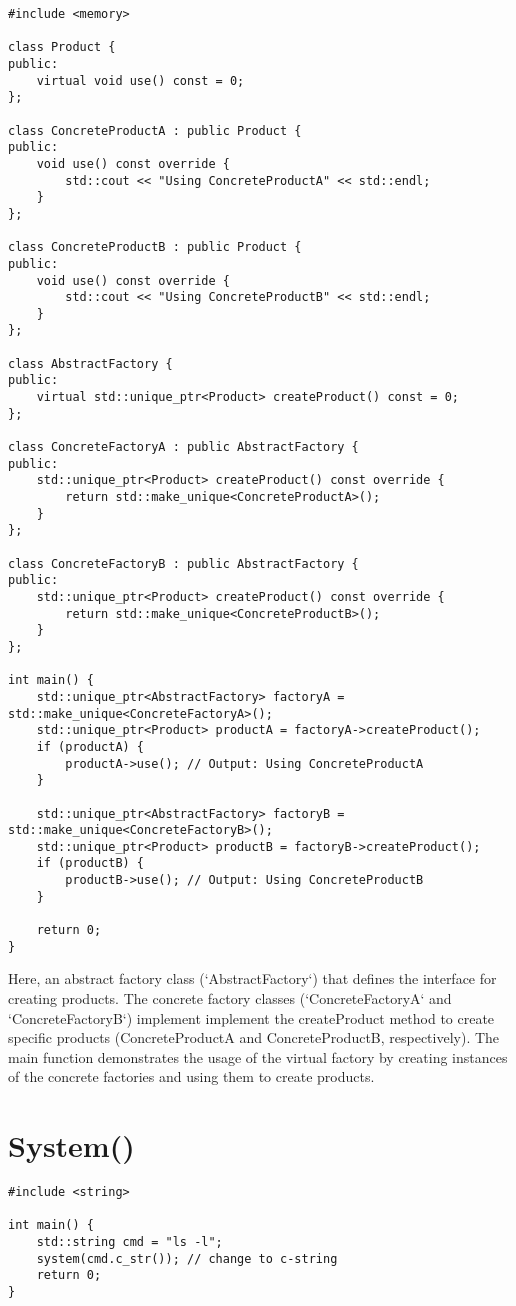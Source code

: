 \documentclass[openany]{report}
\begin{document}
\begin{verbatim}
#include <memory>

class Product {
public:
    virtual void use() const = 0;
};

class ConcreteProductA : public Product {
public:
    void use() const override {
        std::cout << "Using ConcreteProductA" << std::endl;
    }
};

class ConcreteProductB : public Product {
public:
    void use() const override {
        std::cout << "Using ConcreteProductB" << std::endl;
    }
};

class AbstractFactory {
public:
    virtual std::unique_ptr<Product> createProduct() const = 0;
};

class ConcreteFactoryA : public AbstractFactory {
public:
    std::unique_ptr<Product> createProduct() const override {
        return std::make_unique<ConcreteProductA>();
    }
};

class ConcreteFactoryB : public AbstractFactory {
public:
    std::unique_ptr<Product> createProduct() const override {
        return std::make_unique<ConcreteProductB>();
    }
};

int main() {
    std::unique_ptr<AbstractFactory> factoryA = std::make_unique<ConcreteFactoryA>();
    std::unique_ptr<Product> productA = factoryA->createProduct();
    if (productA) {
        productA->use(); // Output: Using ConcreteProductA
    }
    
    std::unique_ptr<AbstractFactory> factoryB = std::make_unique<ConcreteFactoryB>();
    std::unique_ptr<Product> productB = factoryB->createProduct();
    if (productB) {
        productB->use(); // Output: Using ConcreteProductB
    }
    
    return 0;
}
\end{verbatim}

Here, an abstract factory class (`AbstractFactory`) that defines the interface for creating products.
The concrete factory classes (`ConcreteFactoryA` and `ConcreteFactoryB`) implement
implement the createProduct method to create specific products (ConcreteProductA and ConcreteProductB, respectively).
The main function demonstrates the usage of 
the virtual factory by creating instances of the concrete factories and using them to create products.

\section{System()}

\begin{verbatim}
#include <string>

int main() {
    std::string cmd = "ls -l";
    system(cmd.c_str()); // change to c-string
    return 0;
}
\end{verbatim}
\end{document}

